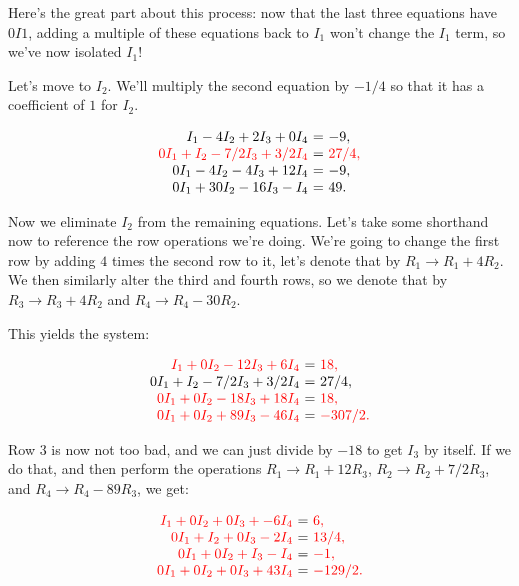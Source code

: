 \documentclass{ximera}
\begin{document}
\begin{example}
\begin{solution}
  Here's the great part about this process: now that the last three equations have $0I1$, adding a multiple of these equations back to $I_1$ won't change the $I_1$ term, so we've now isolated $I_1$!

  Let's move to $I_2$. We'll multiply the second equation by $-1/4$ so that it has a coefficient of $1$ for $I_2$.

  \begin{equation*}
    \begin{array}{r@{~}c@{~}l}
      I_1-4I_2+2I_3+0I_4&=&-9, \\
      \color{red}0I_1+I_2 - 7/2I_3 + 3/2I_4 &=& \color{red}27/4, \\
      0I_1 - 4I_2 - 4I_3 + 12I_4 &=& -9, \\
      0I_1+30I_2 - 16I_3 - I_4 &=& 49.
    \end{array}
  \end{equation*}

  Now we eliminate $I_2$ from the remaining equations. Let's take some shorthand now to reference the row operations we're doing. We're going to change the first row by adding $4$ times the second row to it, let's denote that by $R_1 \rightarrow R_1 + 4R_2$. We then similarly alter the third and fourth rows, so we denote that by $R_3 \rightarrow R_3 + 4R_2$ and $R_4 \rightarrow R_4 - 30R_2$.

  This yields the system:

  \begin{equation*}
    \begin{array}{r@{~}c@{~}l}
      \color{red}I_1+0I_2-12I_3+6I_4&=&\color{red}18, \\
      0I_1+I_2 - 7/2I_3 + 3/2I_4 &=& 27/4, \\
      \color{red}0I_1 + 0I_2 - 18I_3 + 18I_4 &=& \color{red}18, \\
      \color{red}0I_1+0I_2 + 89I_3 - 46I_4 &=& \color{red}-307/2.
    \end{array}
  \end{equation*}

  Row $3$ is now not too bad, and we can just divide by $-18$ to get $I_3$ by itself. If we do that, and then perform the operations $R_1 \rightarrow R_1 + 12R_3$, $R_2 \rightarrow R_2 + 7/2R_3$, and $R_4 \rightarrow R_4 - 89R_3$, we get:

  \begin{equation*}
    \begin{array}{r@{~}c@{~}l}
      \color{red}I_1+0I_2+0I_3+-6I_4&=&\color{red}6, \\
      \color{red}0I_1+I_2 + 0I_3 -2I_4 &=& \color{red}13/4, \\
      \color{red}0I_1 + 0I_2 + I_3 - I_4 &=& \color{red}-1, \\
      \color{red}0I_1+0I_2 + 0I_3 + 43I_4 &=& \color{red}-129/2.
    \end{array}
  \end{equation*}


\end{solution}
\end{example}
\end{document}
